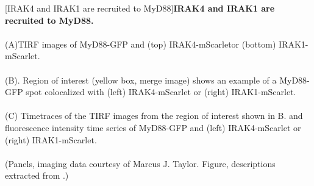\begin{centering}
\captionsetup{parbox=none}
[IRAK4 and IRAK1 are recruited to MyD88]{\textbf{IRAK4 and IRAK1 are recruited to MyD88.}
\\
\\
(A)TIRF images of MyD88-GFP and (top) IRAK4-mScarletor (bottom) IRAK1-mScarlet.
\\
\\
(B). Region of interest (yellow box, merge image) shows an example of a MyD88-GFP spot colocalized with (left) IRAK4-mScarlet or (right) IRAK1-mScarlet.
\\
\\
(C) Timetraces of the TIRF images from the region of interest shown in B.
 and fluorescence intensity time series of MyD88-GFP and (left) IRAK4-mScarlet or (right) IRAK1-mScarlet. 
\\
\\
(Panels, imaging data courtesy of Marcus J. Taylor. Figure, descriptions extracted from \autocite{Deliz-Aguirre_2021}.)}
\label{p1:4a}
\end{centering}


